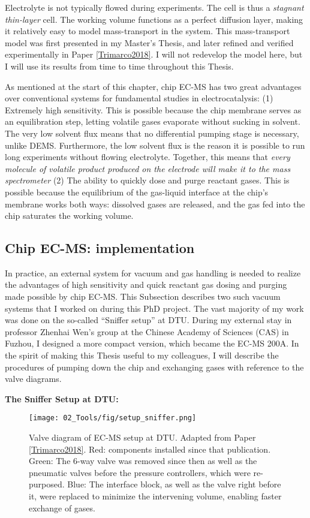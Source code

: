 Electrolyte is not typically flowed during experiments. The cell is thus a \textit{stagnant thin-layer} cell. The working volume functions as a perfect diffusion layer, making it relatively easy to model mass-transport in the system.  This mass-transport model was first presented in my Master's Thesis\cite{Scott2016_MSc}, and later refined and verified experimentally in Paper \ref{Trimarco2018}. I will not redevelop the model here, but I will use its results from time to time throughout this Thesis.

As mentioned at the start of this chapter, chip EC-MS has two great advantages over conventional systems for fundamental studies in electrocatalysis: (1) Extremely high sensitivity. This is possible because the chip membrane serves as an equilibration step, letting volatile gases evaporate without sucking in solvent. The very low solvent flux means that no differential pumping stage is necessary, unlike DEMS. Furthermore, the low solvent flux is the reason it is possible to run long experiments without flowing electrolyte. Together, this means that \textit{every molecule of volatile product produced on the electrode will make it to the mass spectrometer} (2) The ability to quickly dose and purge reactant gases. This is possible because the equilibrium of the gas-liquid interface at the chip's membrane works both ways: dissolved gases are released, and the gas fed into the chip saturates the working volume.

\subsection{Chip EC-MS: implementation}\label{subsec:setups}

In practice, an external system for vacuum and gas handling is needed to realize the advantages of high sensitivity and quick reactant gas dosing and purging made possible by chip EC-MS. This Subsection describes two such vacuum systems that I worked on during this PhD project. The vast majority of my work was done on the so-called ``Sniffer setup'' at DTU. During my external stay in professor Zhenhai Wen's group at the Chinese Academy of Sciences (CAS) in Fuzhou, I designed a more compact version, which became the EC-MS 200A. In the spirit of making this Thesis useful to my colleagues, I will describe the procedures of pumping down the chip and exchanging gases with reference to the valve diagrams.

\textbf{\large The Sniffer Setup at DTU:}
\begin{figure}[h!]
	\texttt{[image: 02\_Tools/fig/setup\_sniffer.png]}
	\caption{Valve diagram of EC-MS setup at DTU. Adapted from Paper \ref{Trimarco2018}. Red: components installed since that publication. Green: The 6-way valve was removed since then as well as the pneumatic valves before the pressure controllers, which were re-purposed. Blue: The interface block, as well as the valve right before it, were replaced to minimize the intervening volume, enabling faster exchange of gases.}
	\label{fig:sniffer}
\end{figure}


